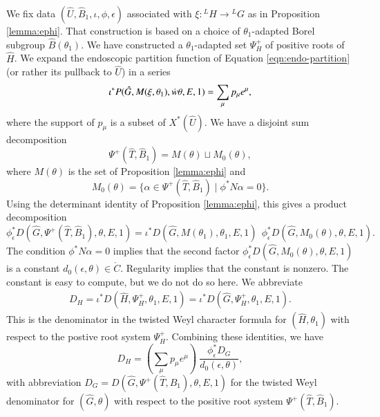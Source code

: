 We fix data $(\hat U,\hat B_1,\iota,\phi,\epsilon)$ associated with
$\xi:{}^LH\to{}^LG$ as in Proposition \ref{lemma:ephi}.  That
construction is based on a choice of $\theta_1$-adapted Borel subgroup
$\hat B(\theta_1)$.  We have constructed a $\theta_1$-adapted set
$\Psi^+_H$ of positive roots of $\hat H$.  We expand the endoscopic
partition function of Equation \ref{eqn:endo-partition} (or rather its
pullback to $\hat U$) in a series
\begin{equation}
\iota^* P(\hat G,M(\xi,\theta_1),\dot w\theta,E,1) = \sum_{\mu} p_\mu e^\mu,
\end{equation}
where the support of $p_\mu$ is a subset of $X^*(\hat U)$.  We have a
disjoint sum decomposition 
\[
\Psi^+(\hat T,\hat B_1) = M(\theta)\sqcup M_0(\theta),
\]
where $M(\theta)$ is the set of Proposition \ref{lemma:ephi} and
\[
M_0(\theta) = \{\alpha\in \Psi^+(\hat T,\hat B_1)\mid \phi^* N\alpha=0\}.
\]
Using the determinant identity of 
Proposition \ref{lemma:ephi}, this gives a product decomposition
\[
\phi^*_\epsilon D(\hat G,\Psi^+(\hat T,\hat B_1),\theta,E,1) = 
\iota^* D(\hat G,M(\theta_1),\theta_1,E,1) \ \ 
\phi^*_\epsilon D(\hat G,M_0(\theta),\theta,E,1).
\]
The condition $\phi^* N\alpha=0$ implies that 
the second factor $\phi^*_\epsilon D(\hat G,M_0(\theta),\theta,E,1)$
is a constant $d_0(\epsilon,\theta)\in\ring{C}$.  Regularity implies that 
the constant is nonzero.  The constant is easy to compute, but we  do not do so here.
We abbreviate
\begin{align*}
D_H = \iota^* D(\hat H,\Psi^+_H,\theta_1,E,1) = \iota^* D(\hat G,\Psi^+_H,\theta_1,E,1).
\end{align*}
This is the denominator in the twisted Weyl character formula for $(\hat H,\theta_1)$
with respect to the postive root system $\Psi^+_H$.
Combining these identities, we have
\begin{equation}\label{eqn:DHDG}
D_H = (\sum_{\mu} p_\mu e^\mu) 
\ \frac{\phi^*_\epsilon D_G}{
d_0(\epsilon,\theta)},
\end{equation}
with abbreviation $D_G= D(\hat G,\Psi^+(\hat T,\hat B_1),\theta,E,1)$ for
the twisted Weyl denominator for $(\hat G,\theta)$ with respect to the positive
root system $\Psi^+(\hat T,\hat B_1)$.





